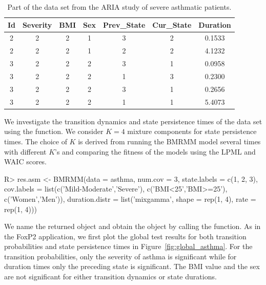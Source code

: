 \begin{table}[h]
    \centering
    \begin{tabular}{ccccccc}
    \toprule
Id & Severity& BMI & Sex &Prev\_State & Cur\_State    &    Duration \\\midrule
2     &   2     &  2      &  1&  3     &    2 & 0.1533\\
2    &   2     &  2      &    1&2     &    2 & 4.1232\\
3     &   2     &  2      &    2&3     &    1 & 0.0958\\
3     &   2     &  2      &    2&1     &    3 & 0.2300\\
3    &   2     &  2      &    2&3     &    1 & 0.2656\\
3     &   2     &  2      &    2&1     &    1 & 5.4073\\\bottomrule
    \end{tabular}
    \caption{Part of the  data set from the ARIA study of severe asthmatic patients.}
    \label{tab:asthma}
\end{table}


{We investigate the transition dynamics and state persistence times of the  data set using the  function. 
We consider $K=4$ mixture components for state persistence times. 
The choice of $K$ is derived from running the BMRMM model several times with different $K$'s and comparing the fitness of the models using the LPML and WAIC scores. }

\begin{example}
R> res.asm <- BMRMM(data = asthma, num.cov = 3, state.labels = c(1, 2, 3), 
                    cov.labels = list(c('Mild-Moderate','Severe'), 
                                      c('BMI<25','BMI>=25'), 
                                      c('Women','Men')),
                    duration.distr = list('mixgamma', shape = rep(1, 4), 
                                                       rate = rep(1, 4)))
\end{example}

{We name the returned  object  and obtain the  object  by calling the  function. 
As in the FoxP2 application, we first plot the global test results for both transition probabilities and state persistence times in Figure~\ref{fig:global_asthma}.
For the transition probabilities, only the severity of asthma is significant while for duration times only the preceding state is significant.
The BMI value and the sex are not significant for either transition dynamics or state durations.}

